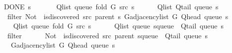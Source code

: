 \begin{isabellebody}
\ \ \ {\isachardoublequoteopen}{\isasymnot}\ DONE\ s{\isachardoublequoteclose}\isanewline
\ \ \isanewline
\ \ \ \ {\isachardoublequoteopen}Q{\isacharunderscore}{\kern0pt}list\ {\isacharparenleft}{\kern0pt}queue\ {\isacharparenleft}{\kern0pt}fold\ G\ src\ s{\isacharparenright}{\kern0pt}{\isacharparenright}{\kern0pt}\ {\isacharequal}{\kern0pt}\isanewline
\ \ \ \ \ Q{\isacharunderscore}{\kern0pt}list\ {\isacharparenleft}{\kern0pt}Q{\isacharunderscore}{\kern0pt}tail\ {\isacharparenleft}{\kern0pt}queue\ s{\isacharparenright}{\kern0pt}{\isacharparenright}{\kern0pt}\ {\isacharat}{\kern0pt}\isanewline
\ \ \ \ \ filter\ {\isacharparenleft}{\kern0pt}Not\ {\isasymcirc}\ is{\isacharunderscore}{\kern0pt}discovered\ src\ {\isacharparenleft}{\kern0pt}parent\ s{\isacharparenright}{\kern0pt}{\isacharparenright}{\kern0pt}\ {\isacharparenleft}{\kern0pt}G{\isachardot}{\kern0pt}adjacency{\isacharunderscore}{\kern0pt}list\ G\ {\isacharparenleft}{\kern0pt}Q{\isacharunderscore}{\kern0pt}head\ {\isacharparenleft}{\kern0pt}queue\ s{\isacharparenright}{\kern0pt}{\isacharparenright}{\kern0pt}{\isacharparenright}{\kern0pt}{\isachardoublequoteclose}\isanewline
%
\isadelimproof
%
\endisadelimproof
%
\isatagproof
{}\isamarkupfalse%
\ {\isacharminus}{\kern0pt}\isanewline
\ \ \isamarkupfalse%
\isanewline
\ \ \ \ {\isachardoublequoteopen}Q{\isacharunderscore}{\kern0pt}list\ {\isacharparenleft}{\kern0pt}queue\ {\isacharparenleft}{\kern0pt}fold\ G\ src\ s{\isacharparenright}{\kern0pt}{\isacharparenright}{\kern0pt}\ {\isacharequal}{\kern0pt}\isanewline
\ \ \ \ \ Q{\isacharunderscore}{\kern0pt}list\ {\isacharparenleft}{\kern0pt}queue\ {\isacharparenleft}{\kern0pt}s{\isasymlparr}queue\ {\isacharcolon}{\kern0pt}{\isacharequal}{\kern0pt}\ Q{\isacharunderscore}{\kern0pt}tail\ {\isacharparenleft}{\kern0pt}queue\ s{\isacharparenright}{\kern0pt}{\isasymrparr}{\isacharparenright}{\kern0pt}{\isacharparenright}{\kern0pt}\ {\isacharat}{\kern0pt}\isanewline
\ \ \ \ \ filter\isanewline
\ \ \ \ \ \ {\isacharparenleft}{\kern0pt}Not\ {\isasymcirc}\ is{\isacharunderscore}{\kern0pt}discovered\ src\ {\isacharparenleft}{\kern0pt}parent\ {\isacharparenleft}{\kern0pt}s{\isasymlparr}queue\ {\isacharcolon}{\kern0pt}{\isacharequal}{\kern0pt}\ Q{\isacharunderscore}{\kern0pt}tail\ {\isacharparenleft}{\kern0pt}queue\ s{\isacharparenright}{\kern0pt}{\isasymrparr}{\isacharparenright}{\kern0pt}{\isacharparenright}{\kern0pt}{\isacharparenright}{\kern0pt}\isanewline
\ \ \ \ \ \ {\isacharparenleft}{\kern0pt}G{\isachardot}{\kern0pt}adjacency{\isacharunderscore}{\kern0pt}list\ G\ {\isacharparenleft}{\kern0pt}Q{\isacharunderscore}{\kern0pt}head\ {\isacharparenleft}{\kern0pt}queue\ s{\isacharparenright}{\kern0pt}{\isacharparenright}{\kern0pt}{\isacharparenright}{\kern0pt}{\isachardoublequoteclose}\isanewline

\end{isabellebody}

